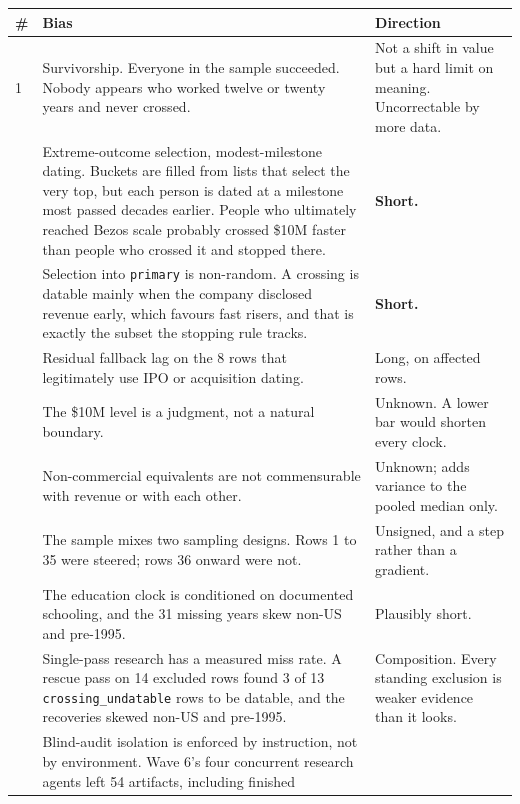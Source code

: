 \documentclass[11pt]{article}
\begin{document}
\begin{table}[h]
\centering
\begin{tabular}{p{}p{}p{}}
\toprule
\# & Bias & Direction \\
\midrule
1 & Survivorship. Everyone in the sample succeeded. Nobody appears who worked
    twelve or twenty years and never crossed. & Not a shift in value but a hard
    limit on meaning. Uncorrectable by more data. \\
\addlinespace
2 & Extreme-outcome selection, modest-milestone dating. Buckets are filled from
    lists that select the very top, but each person is dated at a milestone
    most passed decades earlier. People who ultimately reached Bezos scale
    probably crossed \$10M faster than people who crossed it and stopped there.
    & \textbf{Short.} \\
\addlinespace
3 & Selection into \texttt{primary} is non-random. A crossing is datable mainly
    when the company disclosed revenue early, which favours fast risers, and
    that is exactly the subset the stopping rule tracks. & \textbf{Short.} \\
\addlinespace
5 & Residual fallback lag on the 8 rows that legitimately use IPO or
    acquisition dating. & Long, on affected rows. \\
\addlinespace
6 & The \$10M level is a judgment, not a natural boundary. & Unknown. A lower
    bar would shorten every clock. \\
\addlinespace
7 & Non-commercial equivalents are not commensurable with revenue or with each
    other. & Unknown; adds variance to the pooled median only. \\
\addlinespace
14 & The sample mixes two sampling designs. Rows 1 to 35 were steered; rows 36
    onward were not. & Unsigned, and a step rather than a gradient. \\
\addlinespace
17 & The education clock is conditioned on documented schooling, and the 31
    missing years skew non-US and pre-1995. & Plausibly short. \\
\addlinespace
18 & Single-pass research has a measured miss rate. A rescue pass on 14
    excluded rows found 3 of 13 \texttt{crossing\_undatable} rows to be
    datable, and the recoveries skewed non-US and pre-1995. & Composition.
    Every standing exclusion is weaker evidence than it looks. \\
\addlinespace
22 & Blind-audit isolation is enforced by instruction, not by environment. Wave
    6's four concurrent research agents left 54 artifacts, including finished

\end{tabular}
\end{table}
\end{document}
